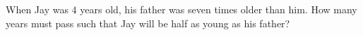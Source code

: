 When Jay was $4$ years old, his father was seven times older than him. How many years must pass such that Jay will be half as young as his father?
